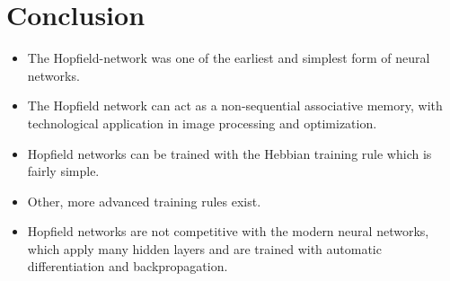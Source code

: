 \documentclass[12pt]{article}
\numberwithin{equation}{section}
\begin{document}
\section*{Conclusion}
\begin{itemize}
    \item The Hopfield-network was one of the earliest and simplest form of neural networks.
    \item The Hopfield network can act as a non-sequential associative memory,
    with technological application in image processing and optimization.
    \item Hopfield networks can be trained with the Hebbian training rule which is fairly simple.
    \item Other, more advanced training rules exist.
    \item Hopfield networks are not competitive with the modern neural networks, which apply 
    many hidden layers and are trained with automatic differentiation and backpropagation.

\end{itemize}


\end{document}
